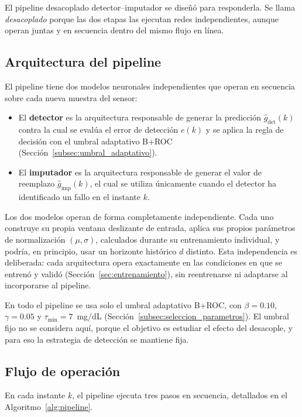 \documentclass{report}
\begin{document}
El pipeline desacoplado detector--imputador se diseñó para responderla. Se llama \textit{desacoplado} porque las dos etapas las ejecutan redes independientes, aunque operan juntas y en secuencia dentro del mismo flujo en línea.

\subsection{Arquitectura del pipeline}
\label{subsec:arquitectura_pipeline}

El pipeline tiene dos modelos neuronales independientes que operan en secuencia sobre cada nueva muestra del sensor:

\begin{itemize}
    \item El \textbf{detector} es la arquitectura responsable de generar la predicción $\hat{g}_{\mathrm{det}}(k)$ contra la cual se evalúa el error de detección $e(k)$ y se aplica la regla de decisión con el umbral adaptativo B+ROC (Sección~\ref{subsec:umbral_adaptativo}).
    \item El \textbf{imputador} es la arquitectura responsable de generar el valor de reemplazo $\hat{g}_{\mathrm{imp}}(k)$, el cual se utiliza únicamente cuando el detector ha identificado un fallo en el instante $k$.
\end{itemize}

Los dos modelos operan de forma completamente independiente. Cada uno construye su propia ventana deslizante de entrada, aplica sus propios parámetros de normalización $(\mu, \sigma)$, calculados durante su entrenamiento individual, y podría, en principio, usar un horizonte histórico $d$ distinto. Esta independencia es deliberada: cada arquitectura opera exactamente en las condiciones en que se entrenó y validó (Sección~\ref{sec:entrenamiento}), sin reentrenarse ni adaptarse al incorporarse al pipeline.

En todo el pipeline se usa solo el umbral adaptativo B+ROC, con $\beta = 0.10$, $\gamma = 0.05$ y $\tau_{\min} = 7$~mg/dL (Sección~\ref{subsec:seleccion_parametros}). El umbral fijo no se considera aquí, porque el objetivo es estudiar el efecto del desacople, y para eso la estrategia de detección se mantiene fija.

\subsection{Flujo de operación}
\label{subsec:flujo_pipeline}

En cada instante $k$, el pipeline ejecuta tres pasos en secuencia, detallados en el Algoritmo~\ref{alg:pipeline}.
\end{document}
